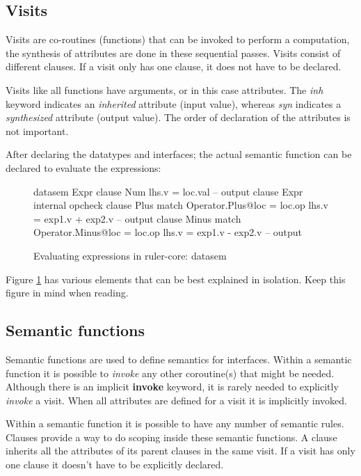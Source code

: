 \subsection{Visits}
Visits are co-routines (functions) that can be invoked to perform a computation, the synthesis of attributes are done in these sequential passes. Visits consist of different clauses. If a visit only has one clause, it does not have to be declared. 

Visits like all functions have arguments, or in this case attributes. The \emph{inh} keyword indicates an \emph{inherited} attribute (input value), whereas \emph{syn} indicates a \emph{synthesized} attribute (output value). The order of declaration of the attributes is not important.

After declaring the datatypes and interfaces; the actual semantic function can be declared to evaluate the expressions:

\begin{figure}[H]
\begin{code}
datasem Expr
   clause Num
     lhs.v = loc.val -- output
   clause Expr
     internal opcheck
       clause Plus
         match Operator.Plus@loc = loc.op
         lhs.v = exp1.v + exp2.v -- output
       clause Minus
         match Operator.Minus@loc = loc.op
         lhs.v = exp1.v - exp2.v -- output
\end{code}
\caption{Evaluating expressions in ruler-core: datasem}
\label{example:tutorial1:datasem}
\end{figure}

Figure \ref{example:tutorial1:datasem} has various elements that can be best explained in isolation. Keep this figure in mind when reading.

\subsection{Semantic functions}
\label{semantics}
Semantic functions are used to define semantics for interfaces. Within a semantic function it is possible to \emph{invoke} any other coroutine(s) that might be needed. Although there is an implicit \textbf{invoke} keyword, it is rarely needed to explicitly \emph{invoke} a visit. When all attributes are defined for a visit it is implicitly invoked.

Within a semantic function it is possible to have any number of semantic rules. Clauses provide a way to do scoping inside these semantic functions. A clause inherits all the attributes of its parent clauses in the same visit. If a visit has only one clause it doesn't have to be explicitly declared. 

